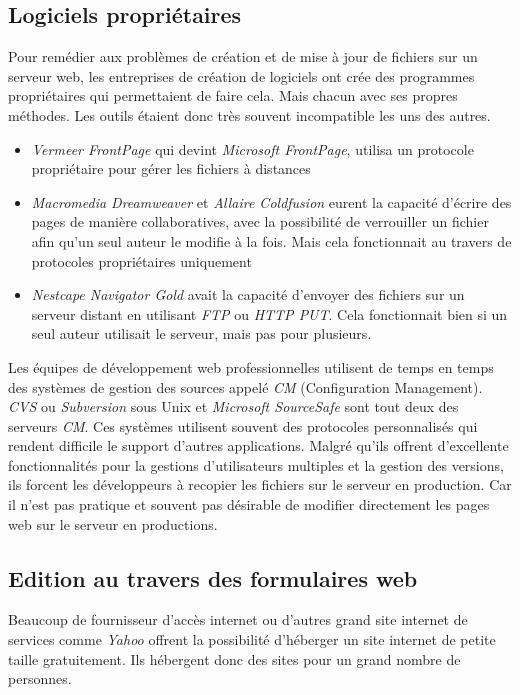 \documentclass[a4paper, 11pt]{article}
\begin{document}
	\subsection{Logiciels propriétaires}
	
		Pour remédier aux problèmes de création et de mise à jour de fichiers sur un serveur web, les entreprises de création de logiciels ont crée des programmes propriétaires qui permettaient de faire cela. Mais chacun avec ses propres méthodes. Les outils étaient donc très souvent incompatible les uns des autres. 
		
		\begin{itemize}
			\item \emph{Vermeer FrontPage} qui devint \emph{Microsoft FrontPage}, utilisa un protocole propriétaire pour gérer les fichiers à distances	
			\item 		\emph{Macromedia Dreamweaver} et \emph{Allaire Coldfusion} eurent la capacité d'écrire des pages de manière collaboratives, avec la possibilité de verrouiller un fichier afin qu'un seul auteur le modifie à la fois. Mais cela fonctionnait au travers de protocoles propriétaires uniquement
			\item 		\emph{Nestcape Navigator Gold} avait la capacité d'envoyer des fichiers sur un serveur distant en utilisant \emph{FTP} ou \emph{HTTP PUT}. Cela fonctionnait bien si un seul auteur utilisait le serveur, mais pas pour plusieurs.
		\end{itemize}
		
		Les équipes de développement web professionnelles utilisent de temps en temps des systèmes de gestion des sources appelé \emph{CM} (Configuration Management). \emph{CVS} ou \emph{Subversion} sous Unix et \emph{Microsoft SourceSafe} sont tout deux des serveurs \emph{CM}. Ces systèmes utilisent souvent des protocoles personnalisés qui rendent difficile le support d'autres applications. Malgré qu'ils offrent d'excellente fonctionnalités pour la gestions d'utilisateurs multiples et la gestion des versions, ils forcent les développeurs à recopier les fichiers sur le serveur en production. Car il n'est pas pratique et souvent pas désirable de modifier directement les pages web sur le serveur en productions. 
	
	\subsection{Edition au travers des formulaires web}
	
		Beaucoup de fournisseur d'accès internet ou d'autres grand site internet de services comme \emph{Yahoo} offrent la possibilité d'héberger un site internet de petite taille gratuitement. Ils hébergent donc des sites pour un grand nombre de personnes. 
		
\end{document}
